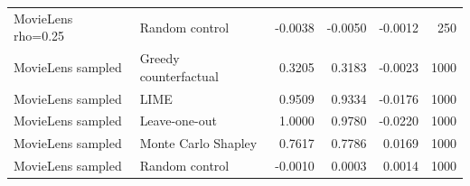 \begin{longtable}{@{}p{}p{}rrrr@{}}
MovieLens rho=0.25 & Random control & -0.0038 & -0.0050 & -0.0012 & 250 \\
MovieLens sampled & Greedy counterfactual & 0.3205 & 0.3183 & -0.0023 & 1000 \\
MovieLens sampled & LIME & 0.9509 & 0.9334 & -0.0176 & 1000 \\
MovieLens sampled & Leave-one-out & 1.0000 & 0.9780 & -0.0220 & 1000 \\
MovieLens sampled & Monte Carlo Shapley & 0.7617 & 0.7786 & 0.0169 & 1000 \\
MovieLens sampled & Random control & -0.0010 & 0.0003 & 0.0014 & 1000 \\
\end{longtable}
